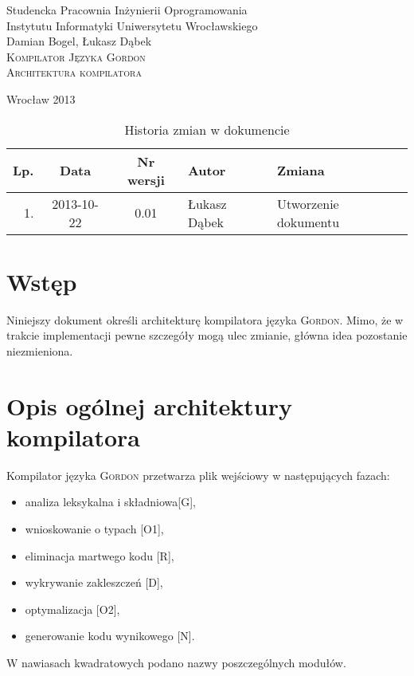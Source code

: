 \documentclass{documentation}
\begin{document}
\begin{titlepage}
\begin{center}
Studencka Pracownia Inżynierii Oprogramowania\\
Instytutu Informatyki Uniwersytetu Wrocławskiego\\[6cm]

Damian Bogel, Łukasz Dąbek\\[1cm]
\textsc{\LARGE Kompilator Języka Gordon}\\[0.5cm]
\textsc{\large Architektura kompilatora}

\vfill
Wrocław 2013 \\[2.5cm]

\end{center}
\end{titlepage}

\newpage
\begin{table}
	\centering
    \captionsetup{name=Tabela}
	\caption{Historia zmian w dokumencie}
		\begin{tabular}{|r|c|c|l|l|}
		\hline
		Lp.  & Data       & Nr wersji & Autor                 & Zmiana \\ \hline
		1.   & 2013-10-22 & 0.01 & Łukasz Dąbek & Utworzenie dokumentu \\ \hline
	\end{tabular}
\end{table}
\newpage

\tableofcontents
\setcounter{page}{2}

\newpage

\section{Wstęp}
\noindent Niniejszy dokument określi architekturę kompilatora języka \textsc{Gordon}. Mimo, że
w trakcie implementacji pewne szczegóły mogą ulec zmianie, główna idea pozostanie
niezmieniona.

\section{Opis ogólnej architektury kompilatora}
\noindent Kompilator języka \textsc{Gordon} przetwarza plik wejściowy w następujących fazach:
\begin{itemize}
    \item analiza leksykalna i składniowa[G],
    \item wnioskowanie o typach [O1],
    \item eliminacja martwego kodu [R],
    \item wykrywanie zakleszczeń [D], 
    \item optymalizacja [O2],
    \item generowanie kodu wynikowego [N].
\end{itemize}
W nawiasach kwadratowych podano nazwy poszczególnych modułów.
\end{document}
